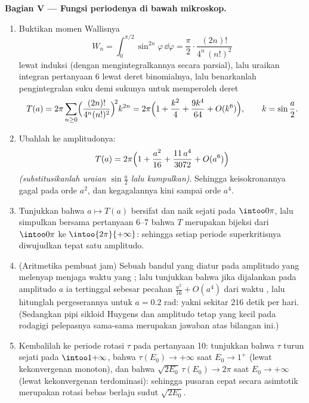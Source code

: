 \begin{problem}
\medskip
\noindent\textbf{Bagian V --- Fungsi periodenya di bawah
mikroskop.}
\begin{enumerate}[resume]
  \item Buktikan momen Wallisnya
        \[
        W_n = \int_0^{\pi/2}\sin^{2n}\varphi\,\dd\varphi
        = \frac\pi2\cdot\frac{(2n)!}{4^n\,(n!)^2}
        \]
        lewat induksi (dengan mengintegralkannya secara parsial), lalu uraikan
        integran pertanyaan 6 lewat deret binomialnya, lalu
        benarkanlah pengintegralan suku demi sukunya untuk memperoleh deret
        \[
        T(a) = 2\pi\sum_{n\geq0}
        \Bigl(\frac{(2n)!}{4^n(n!)^2}\Bigr)^{\!2}k^{2n}
        = 2\pi\Bigl(1 + \frac{k^2}4 + \frac{9k^4}{64}
        + O(k^6)\Bigr),
        \qquad k = \sin\frac a2 .
        \]
  \item Ubahlah ke amplitudonya:
        \[
        T(a) = 2\pi\Bigl(1 + \frac{a^2}{16} +
        \frac{11\,a^4}{3072} + O(a^6)\Bigr)
        \]
        \emph{(substitusikanlah uraian $\sin\frac a2$
        lalu kumpulkan)}. Sehingga keisokronannya gagal pada orde $a^2$, dan
        kegagalannya kini  sampai orde $a^4$.
  \item Tunjukkan bahwa $a \mapsto T(a)$ bersifat  dan
        naik sejati pada $\intoo0\pi$, lalu simpulkan
        bersama pertanyaan 6--7 bahwa $T$ merupakan bijeksi dari
        $\intoo0\pi$ ke $\intoo{2\pi}{+\infty}$: sehingga setiap
        periode superkritisnya diwujudkan tepat satu amplitudo.
  \item (Aritmetika pembuat jam) Sebuah bandul yang diatur pada
        amplitudo yang melenyap menjaga waktu yang ; lalu tunjukkan bahwa jika dijalankan
        pada amplitudo $a$ ia tertinggal sebesar pecahan
        $\frac{a^2}{16} + O(a^4)$ dari waktu , lalu hitunglah
        pergeserannya untuk $a = 0.2$ rad: yakni sekitar $216$ detik per
        hari. (Sedangkan pipi sikloid Huygens dan amplitudo tetap yang kecil
        pada rodagigi pelepasnya sama-sama merupakan jawaban atas bilangan ini.)
  \item Kembalilah ke periode rotasi $\tau$ pada pertanyaan
        10: tunjukkan bahwa $\tau$ turun sejati pada
        $\intoo1{+\infty}$, bahwa $\tau(E_0) \to +\infty$ saat
        $E_0 \to 1^+$ (lewat kekonvergenan monoton), dan bahwa
        $\sqrt{2E_0}\,\tau(E_0) \to 2\pi$ saat $E_0 \to
        +\infty$ (lewat kekonvergenan terdominasi): sehingga pusaran cepat
        secara asimtotik merupakan rotasi bebas berlaju sudut
        $\sqrt{2E_0}$.
\end{enumerate}


\end{problem}
